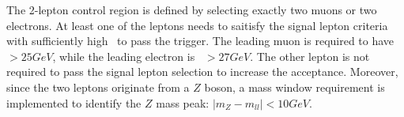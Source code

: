 \par The 2-lepton control region is defined by selecting exactly two muons or two electrons. 
At least one of the leptons needs to saitisfy the signal lepton criteria with sufficiently high \pt~to pass the trigger. 
The leading muon is required to have \pt~$>25GeV$, while the leading electron is \pt~$>27GeV$. 
The other lepton is not required to pass the signal lepton selection to increase the acceptance. 
Moreover, since the two leptons originate from a $Z$ boson, a mass window requirement is implemented to identify the $Z$ mass peak: $|m_{Z}-m_{ll}|<10GeV$.
